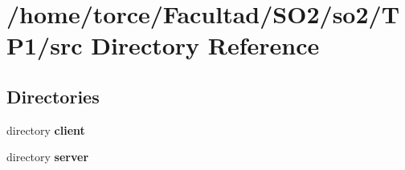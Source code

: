 \section{/home/torce/\+Facultad/\+S\+O2/so2/\+T\+P1/src Directory Reference}
\label{dir_68267d1309a1af8e8297ef4c3efbcdba}
\subsection*{Directories}
\begin{DoxyCompactItemize}
\item 
directory \textbf{ client}
\item 
directory \textbf{ server}
\end{DoxyCompactItemize}

